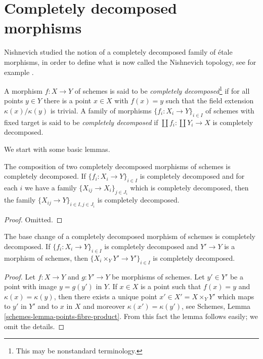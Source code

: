 \section{Completely decomposed morphisms}
\label{section-completely-decomposed}

\noindent
Nishnevich studied the notion of a completely decomposed family
of \'etale morphisms, in order to define what is now called the
Nishnevich topology, see for example \cite{Nishnevich}.

\begin{definition}
\label{definition-cd-morphism}
A morphism $f : X \to Y$ of schemes is said to be
{\it completely decomposed}\footnote{This may be nonstandard terminology.}
if for all points $y \in Y$ there
is a point $x \in X$ with $f(x) = y$ such that the field
extension $\kappa(x)/\kappa(y)$ is trivial.
A family of morphisms $\{f_i : X_i \to Y\}_{i \in I}$ of
schemes with fixed target is said to be {\it completely decomposed}
if $\coprod f_i : \coprod Y_i \to X$ is completely decomposed.
\end{definition}

\noindent
We start with some basic lemmas.

\begin{lemma}
\label{lemma-composition-cd}
The composition of two completely decomposed morphisms of schemes
is completely decomposed.
If $\{f_i : X_i \to Y\}_{i \in I}$ is completely decomposed
and for each $i$ we have a family $\{X_{ij} \to X_i\}_{j \in J_i}$
which is completely decomposed, then the family
$\{X_{ij} \to Y\}_{i \in I, j \in J_i}$ is completely decomposed.
\end{lemma}

\begin{proof}
Omitted.
\end{proof}

\begin{lemma}
\label{lemma-base-change-cd}
The base change of a completely decomposed morphism of schemes
is completely decomposed.
If $\{f_i : X_i \to Y\}_{i \in I}$ is completely decomposed
and $Y' \to Y$ is a morphism of schemes, then
$\{X_i \times_Y Y' \to Y'\}_{i \in I}$ is completely
decomposed.
\end{lemma}

\begin{proof}
Let $f : X \to Y$ and $g : Y' \to Y$ be morphisms of schemes.
Let $y' \in Y'$ be a point with image $y = g(y')$ in $Y$.
If $x \in X$ is a point such that $f(x) = y$ and $\kappa(x) = \kappa(y)$,
then there exists a unique point $x' \in X' = X \times_Y Y'$
which maps to $y'$ in $Y'$ and to $x$ in $X$ and moreover
$\kappa(x') = \kappa(y')$, see
Schemes, Lemma \ref{schemes-lemma-points-fibre-product}.
From this fact the lemma follows easily; we omit the details.
\end{proof}

